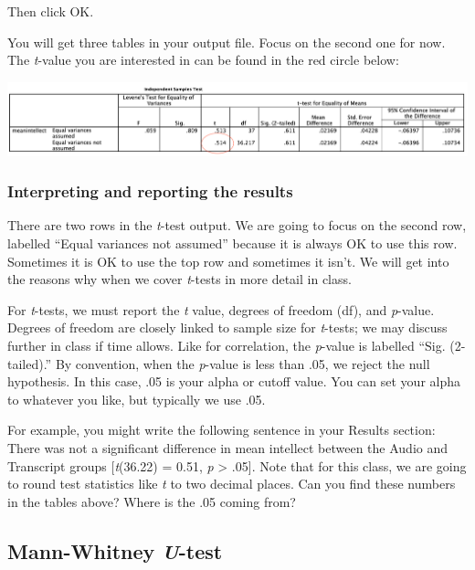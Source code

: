 \documentclass[
]{book}
\begin{document}
Then click {OK}.

You will get three tables in your output file. Focus on the second one for now. The \emph{t}-value you are interested in can be found in the red circle below:

\includegraphics{img/12.2.7.png}

\hypertarget{interpreting-and-reporting-the-results-1}{%
\subsubsection{Interpreting and reporting the results}\label{interpreting-and-reporting-the-results-1}}

There are two rows in the \emph{t}-test output. We are going to focus on the second row, labelled ``Equal variances not assumed'' because it is always OK to use this row. Sometimes it is OK to use the top row and sometimes it isn't. We will get into the reasons why when we cover \emph{t}-tests in more detail in class.

For \emph{t}-tests, we must report the \emph{t} value, degrees of freedom (df), and \emph{p}-value. Degrees of freedom are closely linked to sample size for \emph{t}-tests; we may discuss further in class if time allows. Like for correlation, the \emph{p}-value is labelled ``Sig. (2-tailed).'' By convention, when the \emph{p}-value is less than .05, we reject the null hypothesis. In this case, .05 is your alpha or cutoff value. You can set your alpha to whatever you like, but typically we use .05.

For example, you might write the following sentence in your Results section:
There was not a significant difference in mean intellect between the Audio and Transcript groups {[}\emph{t}(36.22) = 0.51, \emph{p} \textgreater{} .05{]}.
Note that for this class, we are going to round test statistics like \emph{t} to two decimal places. Can you find these numbers in the tables above? Where is the .05 coming from?

\hypertarget{mann-whitney-u-test-1}{%
\subsection{\texorpdfstring{Mann-Whitney \emph{U}-test}{Mann-Whitney U-test}}\label{mann-whitney-u-test-1}}
\end{document}
